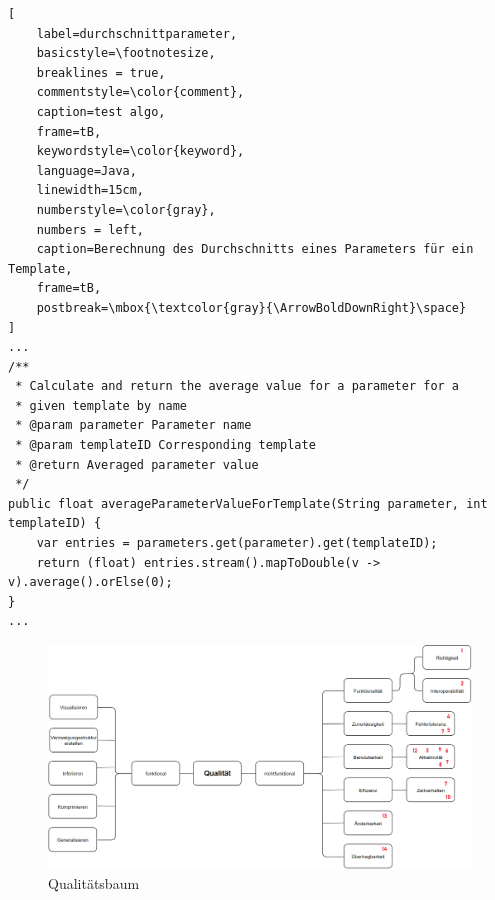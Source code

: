 \begin{lstlisting}[
    label=durchschnittparameter,
    basicstyle=\footnotesize,
    breaklines = true,
    commentstyle=\color{comment},
    caption=test algo,
    frame=tB,
    keywordstyle=\color{keyword},
    language=Java,
    linewidth=15cm,
    numberstyle=\color{gray},
    numbers = left,
    caption=Berechnung des Durchschnitts eines Parameters für ein Template,
    frame=tB,
    postbreak=\mbox{\textcolor{gray}{\ArrowBoldDownRight}\space}
]
...
/**
 * Calculate and return the average value for a parameter for a
 * given template by name
 * @param parameter Parameter name
 * @param templateID Corresponding template
 * @return Averaged parameter value
 */
public float averageParameterValueForTemplate(String parameter, int templateID) {
    var entries = parameters.get(parameter).get(templateID);
    return (float) entries.stream().mapToDouble(v -> v).average().orElse(0);
}
...
\end{lstlisting}

\begin{figure}[H]
    \centering
    \includegraphics[width=18cm,angle=90]{../images/baum_nummern.png}
    \caption{Qualitätsbaum}
    \label{baum}
\end{figure}